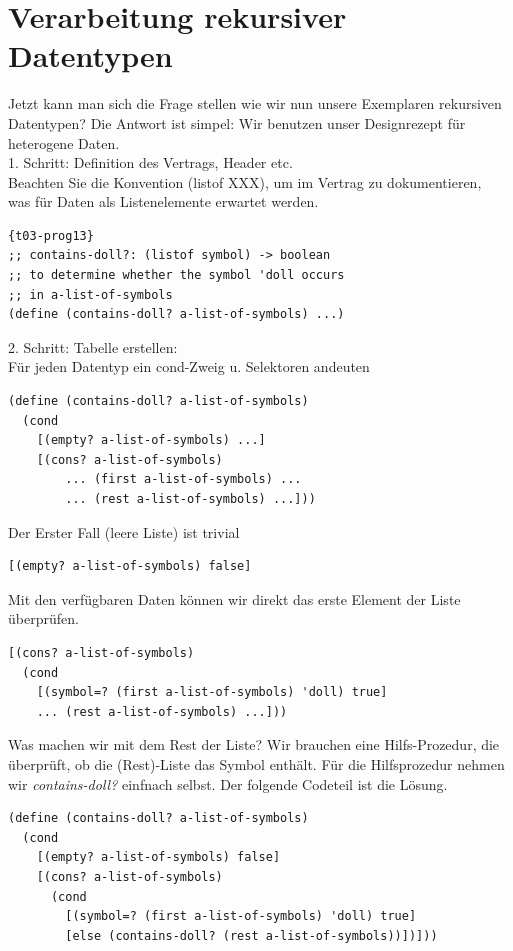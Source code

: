 \section{Verarbeitung rekursiver Datentypen}
Jetzt kann man sich die Frage stellen wie wir nun unsere Exemplaren rekursiven Datentypen? Die Antwort ist simpel: Wir benutzen unser Designrezept für heterogene Daten.\\

1. Schritt: Definition des Vertrags, Header etc. \\
Beachten Sie die Konvention (listof XXX), um im Vertrag zu dokumentieren, \\
was für Daten als Listenelemente erwartet werden.
\begin{lstlisting}{t03-prog13}
;; contains-doll?: (listof symbol) -> boolean
;; to determine whether the symbol 'doll occurs
;; in a-list-of-symbols
(define (contains-doll? a-list-of-symbols) ...)
\end{lstlisting}

2. Schritt: Tabelle erstellen:\\
Für jeden Datentyp ein cond-Zweig u. Selektoren andeuten\\
\begin{lstlisting}[firstnumber=4]
(define (contains-doll? a-list-of-symbols)
  (cond
    [(empty? a-list-of-symbols) ...]
    [(cons? a-list-of-symbols)
        ... (first a-list-of-symbols) ...
        ... (rest a-list-of-symbols) ...]))
\end{lstlisting}
Der Erster Fall (leere Liste) ist trivial
\begin{lstlisting}[firstnumber=6]
[(empty? a-list-of-symbols) false]
\end{lstlisting}

Mit den verfügbaren Daten können wir direkt das erste Element
der Liste überprüfen.

\begin{lstlisting}[firstnumber=7]
[(cons? a-list-of-symbols)
  (cond
    [(symbol=? (first a-list-of-symbols) 'doll) true]
    ... (rest a-list-of-symbols) ...]))
\end{lstlisting}
Was machen wir mit dem Rest der Liste? Wir brauchen eine Hilfs-Prozedur, die überprüft, ob die (Rest)-Liste das Symbol enthält. Für die Hilfsprozedur nehmen wir \textit{contains-doll?} einfnach selbst. Der folgende Codeteil ist die Lösung.

\begin{lstlisting}
(define (contains-doll? a-list-of-symbols)
  (cond
    [(empty? a-list-of-symbols) false]
    [(cons? a-list-of-symbols)
      (cond
        [(symbol=? (first a-list-of-symbols) 'doll) true]
        [else (contains-doll? (rest a-list-of-symbols))])]))
\end{lstlisting}


